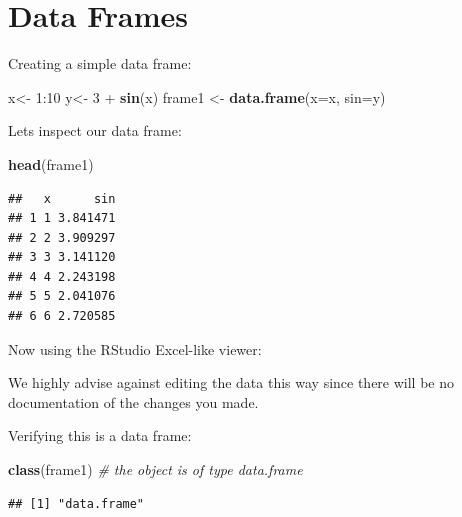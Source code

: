 \documentclass[]{book}
\newenvironment{Shaded}{\begin{snugshade}}{\end{snugshade}}
\newcommand{\KeywordTok}[1]{\textcolor[rgb]{0.13,0.29,0.53}{\textbf{{#1}}}}
\newcommand{\DataTypeTok}[1]{\textcolor[rgb]{0.13,0.29,0.53}{{#1}}}
\newcommand{\DecValTok}[1]{\textcolor[rgb]{0.00,0.00,0.81}{{#1}}}
\newcommand{\StringTok}[1]{\textcolor[rgb]{0.31,0.60,0.02}{{#1}}}
\newcommand{\CommentTok}[1]{\textcolor[rgb]{0.56,0.35,0.01}{\textit{{#1}}}}
\newcommand{\NormalTok}[1]{{#1}}
\theoremstyle{definition}
\theoremstyle{definition}
\theoremstyle{remark}
\begin{document}
\section{Data Frames}\label{data-frames}

Creating a simple data frame:

\begin{Shaded}
\begin{Highlighting}[]
\NormalTok{x<-}\StringTok{ }\DecValTok{1}\NormalTok{:}\DecValTok{10}
\NormalTok{y<-}\StringTok{ }\DecValTok{3} \NormalTok{+}\StringTok{ }\KeywordTok{sin}\NormalTok{(x) }
\NormalTok{frame1 <-}\StringTok{ }\KeywordTok{data.frame}\NormalTok{(}\DataTypeTok{x=}\NormalTok{x, }\DataTypeTok{sin=}\NormalTok{y)    }
\end{Highlighting}
\end{Shaded}

Lets inspect our data frame:

\begin{Shaded}
\begin{Highlighting}[]
\KeywordTok{head}\NormalTok{(frame1)}
\end{Highlighting}
\end{Shaded}

\begin{verbatim}
##   x      sin
## 1 1 3.841471
## 2 2 3.909297
## 3 3 3.141120
## 4 4 2.243198
## 5 5 2.041076
## 6 6 2.720585
\end{verbatim}

Now using the RStudio Excel-like viewer:

\begin{Shaded}
\end{Shaded}

We highly advise against editing the data this way since there will be
no documentation of the changes you made.

Verifying this is a data frame:

\begin{Shaded}
\begin{Highlighting}[]
\KeywordTok{class}\NormalTok{(frame1) }\CommentTok{# the object is of type data.frame}
\end{Highlighting}
\end{Shaded}

\begin{verbatim}
## [1] "data.frame"
\end{verbatim}
\end{document}
